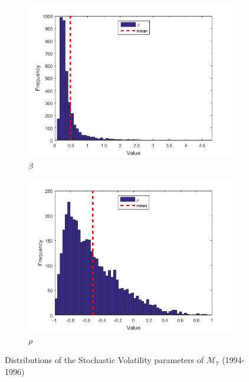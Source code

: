 \documentclass[11pt,a4,twosided,singlespacing,titlepagenumber=on]{scrreprt}
\numberwithin{equation}{chapter} %
\theoremstyle{remark}
\begin{document}
\begin{figure}[H]
\begin{subfigure}[t]{0.32\textwidth}
        \includegraphics[width=1\textwidth]{res/params/1462_2192/5}
        \caption{$\beta$}
    \end{subfigure}
    \begin{subfigure}[t]{0.32\textwidth}
        \centering
        \includegraphics[width=1\textwidth]{res/params/1462_2192/6}
        \caption{$\rho$}
    \end{subfigure}
    \caption[]{Distributions of the Stochastic Volatility parameters of $\mathcal{M}_7$ (1994-1996)}
    \label{fig:param_dists_2000_2002}
\end{figure}
\end{document}
